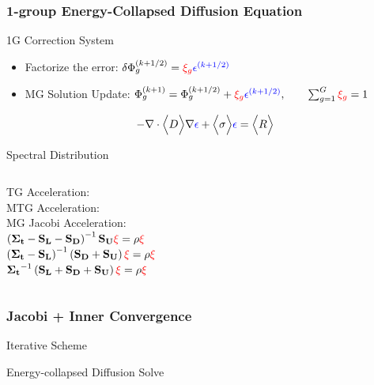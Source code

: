 \documentclass[compress,10pt]{beamer}
\renewcommand{\vec}[1]{\mathbf{#1}}
\newcommand{\tcr}[1]{\textcolor{red}{#1}}
\newcommand{\tcb}[1]{\textcolor{blue}{#1}}
\begin{document}
\begin{frame}[t]\frametitle{1-group Energy-Collapsed Diffusion Equation}
\vspace{-3mm}
\begin{block}{1G Correction System}{\small
\begin{itemize}
\item Factorize the error: $\delta \Phi_{g}^{(k+1/2)} = \tcr{\xi_g} \tcb{\epsilon^{(k+1/2)}}$
\item MG Solution Update:  $ \Phi_{g}^{(k+1)} =  \Phi_{g}^{(k+1/2)} + \tcr{\xi_g} \tcb{\epsilon^{(k+1/2)}}, \qquad \sum\displaylimits_{g=1}^{G} \tcr{\xi_g} = 1 $ 
\end{itemize}
\vspace{4mm}
\begin{equation*}
-\vec{\nabla} \cdot \Big< D \Big> \vec{\nabla} \tcb{\epsilon} + \Big< \sigma \Big> \tcb{\epsilon} = \Big< R \Big>
\end{equation*}
}\end{block}
\begin{block}{Spectral Distribution}{\small
\begin{columns}
TG Acceleration:  \\ \vspace{3mm}
MTG Acceleration:  \\ \vspace{3mm}
MG Jacobi Acceleration:  \\
$\left(  {\bf \Sigma_t} - {\bf S_{L}} - {\bf S_{D}} \right)^{-1} {\bf S_{U}} {\bf \tcr{\xi}} = \rho {\bf \tcr{\xi}}$ \\ \vspace{3mm}
$\left(  {\bf \Sigma_t} - {\bf S_{L}}  \right)^{-1} \left( {\bf S_{D}} + {\bf S_{U}} \right) {\bf \tcr{\xi}} = \rho {\bf \tcr{\xi}}$ \\ \vspace{3mm}
${\bf \Sigma_t}^{-1} \left( {\bf S_L} + {\bf S_D} +{\bf S_U} \right) {\bf \tcr{\xi}} = \rho {\bf \tcr{\xi}}$ \\
\end{columns}
}\end{block}
\end{frame}
\begin{frame}[t]\frametitle{Jacobi + Inner Convergence}
\begin{block}{Iterative Scheme}

\end{block}
\begin{block}{Energy-collapsed Diffusion Solve}

\end{block}
\end{frame}
\end{document}
